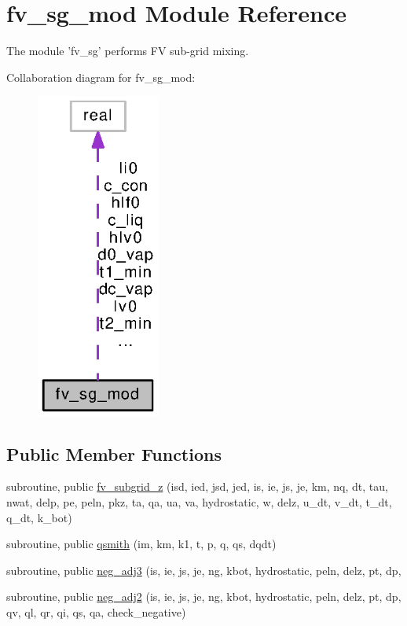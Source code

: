 \section{fv\-\_\-sg\-\_\-mod Module Reference}
\label{classfv__sg__mod}


The module 'fv\-\_\-sg' performs F\-V sub-\/grid mixing.  




Collaboration diagram for fv\-\_\-sg\-\_\-mod\-:
\nopagebreak
\begin{figure}[H]
\begin{center}
\leavevmode
\includegraphics[width=115pt]{classfv__sg__mod__coll__graph}
\end{center}
\end{figure}
\subsection*{Public Member Functions}
\begin{DoxyCompactItemize}
\item 
subroutine, public \hyperlink{classfv__sg__mod_a12f8e293e862927c307b386cdd8217cb}{fv\-\_\-subgrid\-\_\-z} (isd, ied, jsd, jed, is, ie, js, je, km, nq, dt, tau, nwat, delp, pe, peln, pkz, ta, qa, ua, va, hydrostatic, w, delz, u\-\_\-dt, v\-\_\-dt, t\-\_\-dt, q\-\_\-dt, k\-\_\-bot)
\item 
subroutine, public \hyperlink{classfv__sg__mod_a091058b73522dcd58a8f2787aa4c9973}{qsmith} (im, km, k1, t, p, q, qs, dqdt)
\item 
subroutine, public \hyperlink{classfv__sg__mod_a8d257ccad66089458515a550f71a4855}{neg\-\_\-adj3} (is, ie, js, je, ng, kbot, hydrostatic, peln, delz, pt, dp,
\item 
subroutine, public \hyperlink{classfv__sg__mod_aca56b99deacecc35854d54c6978dc131}{neg\-\_\-adj2} (is, ie, js, je, ng, kbot, hydrostatic, peln, delz, pt, dp, qv, ql, qr, qi, qs, qa, check\-\_\-negative)
\end{DoxyCompactItemize}

